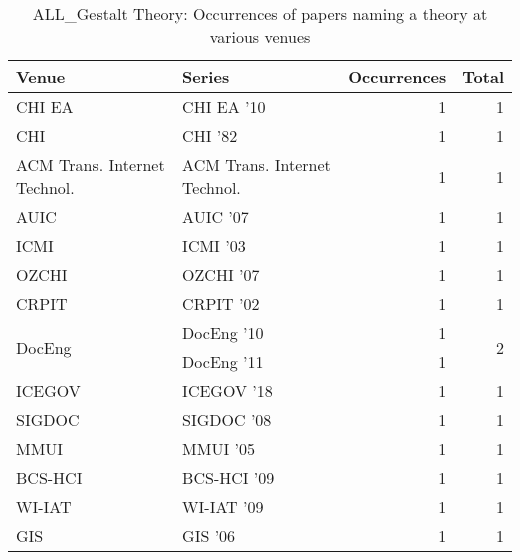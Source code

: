 \begin{table*}[t]
\begin{tabular}{llrr}
Venue & Series & Occurrences & Total\\\hline
\multirow{1}{*}{CHI EA } & CHI EA '10 & 1 & \multirow{1}{*}{1}\\
\multirow{1}{*}{CHI } & CHI '82 & 1 & \multirow{1}{*}{1}\\
\multirow{1}{*}{ACM Trans. Internet Technol.} & ACM Trans. Internet Technol. & 1 & \multirow{1}{*}{1}\\
\multirow{1}{*}{AUIC } & AUIC '07 & 1 & \multirow{1}{*}{1}\\
\multirow{1}{*}{ICMI } & ICMI '03 & 1 & \multirow{1}{*}{1}\\
\multirow{1}{*}{OZCHI } & OZCHI '07 & 1 & \multirow{1}{*}{1}\\
\multirow{1}{*}{CRPIT } & CRPIT '02 & 1 & \multirow{1}{*}{1}\\
\multirow{2}{*}{DocEng } & DocEng '10 & 1 & \multirow{2}{*}{2}\\
& DocEng '11 & 1 &\\
\multirow{1}{*}{ICEGOV } & ICEGOV '18 & 1 & \multirow{1}{*}{1}\\
\multirow{1}{*}{SIGDOC } & SIGDOC '08 & 1 & \multirow{1}{*}{1}\\
\multirow{1}{*}{MMUI } & MMUI '05 & 1 & \multirow{1}{*}{1}\\
\multirow{1}{*}{BCS-HCI } & BCS-HCI '09 & 1 & \multirow{1}{*}{1}\\
\multirow{1}{*}{WI-IAT } & WI-IAT '09 & 1 & \multirow{1}{*}{1}\\
\multirow{1}{*}{GIS } & GIS '06 & 1 & \multirow{1}{*}{1}\\
\end{tabular}
\caption{ALL\_Gestalt Theory: Occurrences of papers naming a theory at various venues}
\end{table*}